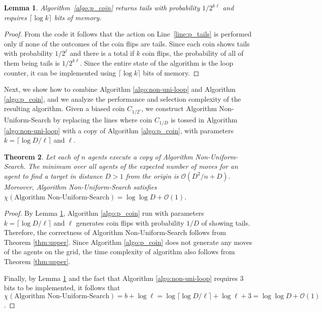 \documentclass[11pt]{article}
\newtheorem{theorem}{Theorem}[section]
\newtheorem{lemma}[theorem]{Lemma}
\newcommand{\BO}{\mathcal{O}}
\begin{document}
\begin{lemma}
\label{lem:p_coin}
	Algorithm~\ref{algo:p_coin} returns tails with probability $1/2^{k\ell}$ and requires $\lceil\log k\rceil$ bits of memory.
\end{lemma}
\begin{proof}
	From the code it follows that the action on Line~\ref{line:p_tails} is performed only if none of the outcomes of the coin flips are tails. Since each coin shows tails with probability $1/2^\ell$ and there is a total if $k$ coin flips, the probability of all of them being tails is $1/2^{k\ell}$. Since the entire state of the algorithm is the loop counter, it can be implemented using $\lceil\log k\rceil$ bits of memory.
\end{proof}


Next, we show how to combine Algorithm \ref{algo:non-uni-loop} and Algorithm \ref{algo:p_coin}, and we analyze the performance and selection complexity of the resulting algorithm. Given a biased coin $C_{1/2^{\ell}}$, we construct Algorithm Non-Uniform-Search  by replacing the lines where coin $C_{1/D}$ is tossed in Algorithm \ref{algo:non-uni-loop} with a copy of Algorithm \ref{algo:p_coin}, with parameters $k = \lceil \log D / \ell \rceil$ and $\ell$.


\begin{theorem}
\label{thm:algoA}
Let each of $n$ agents execute a copy of Algorithm Non-Uniform-Search. The minimum over all agents of the expected number of moves for an agent to find a target in distance $D > 1$ from the origin is $\BO(D^2/n + D)$. Moreover, Algorithm Non-Uniform-Search satisfies $\chi(\text{Algorithm Non-Uniform-Search}) = \log \log D +\BO(1)$.
\end{theorem}

\begin{proof}
	 By Lemma \ref{lem:p_coin}, Algorithm \ref{algo:p_coin} run with parameters $k = \lceil \log D / \ell \rceil$ and $\ell$ generates coin flips with probability $1/D$ of showing tails. Therefore, the correctness of Algorithm Non-Uniform-Search follows from Theorem \ref{thm:upper}. Since Algorithm \ref{algo:p_coin} does not generate any moves of the agents on the grid, the time complexity of algorithm also follows from Theorem \ref{thm:upper}. 
	 
	 Finally, by Lemma \ref{lem:p_coin} and the fact that Algorithm \ref{algo:non-uni-loop} requires $3$ bits to be implemented, it follows that $\chi(\text{Algorithm Non-Uniform-Search}) = b + \log \ell = \log \lceil \log D / \ell \rceil + \log \ell + 3 = \log \log D + \BO(1)$.
\end{proof}
\end{document}

